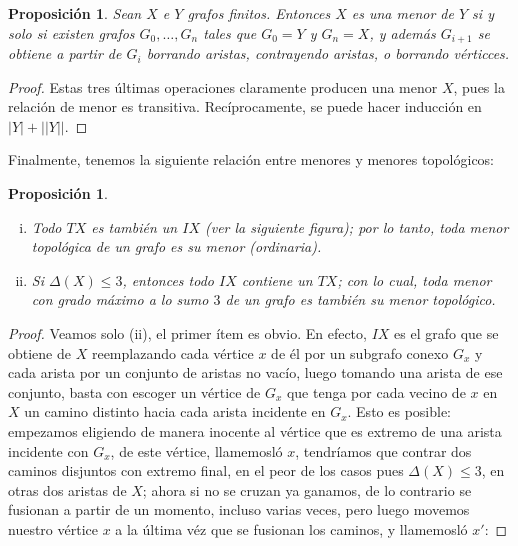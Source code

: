 \documentclass[12pt]{report}
\theoremstyle{plain}
\newtheorem{proposition}[theorem]{Proposición}
\theoremstyle{definition}
\newcommand{\abs}[1]{\left \vert #1 \right \vert}
\newcommand{\Abs}[1]{\left \vert \left \vert #1 \right \vert \right \vert}
\begin{document}
\begin{proposition}
Sean $X$ e $Y$ grafos finitos. Entonces $X$ es una menor de $Y$ si y solo si existen grafos $G_0,\ldots,G_n$ tales que $G_0 = Y$ y $G_n = X$, y además $G_{i+1}$ se obtiene a partir de $G_i$ borrando aristas, contrayendo aristas, o borrando vérticces.
\end{proposition}
\begin{proof}
Estas tres últimas operaciones claramente producen una menor $X$, pues la relación de menor es transitiva. Recíprocamente, se puede hacer inducción en $\abs Y + \Abs Y$.
\end{proof}

Finalmente, tenemos la siguiente relación entre menores y menores topológicos:

\begin{proposition}
\begin{enumerate}[(i)]
\item Todo $TX$ es también un $IX$ (ver la siguiente figura); por lo tanto, toda menor topológica de un grafo es su menor (ordinaria).
\item Si $\Delta (X) \leq 3$, entonces todo $IX$ contiene un $TX$; con lo cual, toda menor con grado máximo a lo sumo $3$ de un grafo es también su menor topológico.
\end{enumerate}
\end{proposition}
\begin{proof}
Veamos solo (ii), el primer ítem es obvio. En efecto, $IX$ es el grafo que se obtiene de $X$ reemplazando cada vértice $x$ de él por un subgrafo conexo $G_x$ y cada arista por un conjunto de aristas no vacío, luego tomando una arista de ese conjunto, basta con escoger un vértice de $G_x$ que tenga por cada vecino de $x$ en $X$ un camino distinto hacia cada arista incidente en $G_x$. Esto es posible: empezamos eligiendo de manera inocente al vértice que es extremo de una arista incidente con $G_x$, de este vértice, llamemosló $x$, tendríamos que contrar dos caminos disjuntos con extremo final, en el peor de los casos pues $\Delta (X) \leq 3$, en otras dos aristas de $X$; ahora si no se cruzan ya ganamos, de lo contrario se fusionan a partir de un momento, incluso varias veces, pero luego movemos nuestro vértice $x$ a la última véz que se fusionan los caminos, y llamemosló $x'$:


\end{proof}
\end{document}
